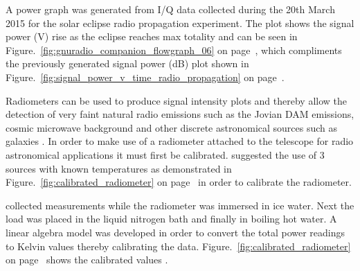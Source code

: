 A power graph was generated from I/Q data collected during the 20th March 2015 for the solar eclipse radio propagation experiment. The plot shows the signal power (V) rise as the eclipse reaches max totality and can be seen in Figure.~\ref{fig:gnuradio_companion_flowgraph_06} on page~\pageref{fig:gnuradio_companion_flowgraph_06}, which compliments the previously generated signal power (dB) plot shown in Figure.~\ref{fig:signal_power_v_time_radio_propagation} on page~\pageref{fig:signal_power_v_time_radio_propagation}.

Radiometers can be used to produce signal intensity plots and thereby allow the detection of very faint natural radio emissions such as the Jovian \gls{DAM} emissions, cosmic microwave background and other discrete astronomical sources such as galaxies \citep{nrao-10}. In order to make use of a radiometer attached to the telescope for radio astronomical applications it must first be calibrated. \cite{nelson-15} suggested the use of 3 sources with known temperatures as demonstrated in Figure.~\ref{fig:calibrated_radiometer} on page~\pageref{fig:calibrated_radiometer} in order to calibrate the radiometer.

\citet{nelson-15} collected measurements while the radiometer was immersed in ice water. Next the load was placed in the liquid nitrogen bath and finally in boiling hot water. A linear algebra model was developed in order to convert the total power readings to Kelvin values thereby calibrating the data. Figure.~\ref{fig:calibrated_radiometer} on page~\pageref{fig:calibrated_radiometer} shows the calibrated values \citep{nelson-15}.


